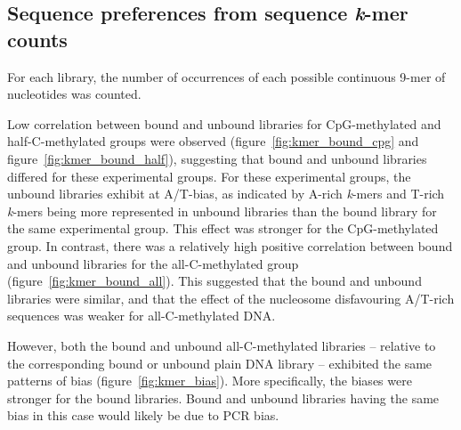 \documentclass[parskip=full, numbers=noenddot]{scrbook}
\begin{document}
\subsection{Sequence preferences from sequence \emph{k}-mer counts}
\label{ssec:nuseqpref_kmer}

For each library, the number of occurrences of each possible continuous 9-mer of nucleotides was counted.

Low correlation between bound and unbound libraries for CpG-methylated and half-C-methylated groups were observed (figure~\ref{fig:kmer_bound_cpg} and figure~\ref{fig:kmer_bound_half}), suggesting that bound and unbound libraries differed for these experimental groups.  For these experimental groups, the unbound libraries exhibit at A/T-bias, as indicated by A-rich \emph{k}-mers and T-rich \emph{k}-mers being more represented in unbound libraries than the bound library for the same experimental group.  This effect was stronger for the CpG-methylated group.  In contrast, there was a relatively high positive correlation between bound and unbound libraries for the all-C-methylated group (figure~\ref{fig:kmer_bound_all}).  This suggested that the bound and unbound libraries were similar, and that the effect of the nucleosome disfavouring A/T-rich sequences was weaker for all-C-methylated DNA.

However, both the bound and unbound all-C-methylated libraries -- relative to the corresponding bound or unbound plain DNA library -- exhibited the same patterns of bias (figure~\ref{fig:kmer_bias}).  More specifically, the biases were stronger for the bound libraries.  Bound and unbound libraries having the same bias in this case would likely be due to PCR bias.
\end{document}
